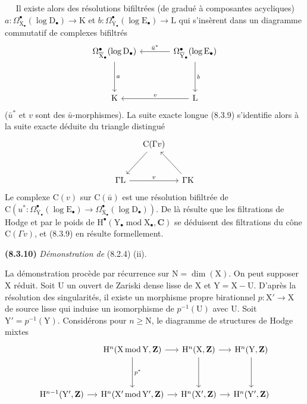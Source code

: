 \documentclass[11pt,leqno]{article}
\newcommand{\Page}[1]{\ifvmode\noindent\else\unskip\ \fi{\footnotesize\textcolor{gray}{[p.\,#1]}}\ \ignorespaces}
\begin{document}
\Page{44}
Il existe alors des résolutions bifiltrées (de gradué à composantes acycliques) \(a:\Omega_{\overline{\mathrm{X}}_\bullet}^\bullet(\log\mathrm{D}_\bullet)\to\mathrm{K}\) et \(b:\Omega_{\overline{\mathrm{Y}}_\bullet}^\bullet(\log\mathrm{E}_\bullet)\to\mathrm{L}\) qui s’insèrent dans un diagramme commutatif de complexes bifiltrés
\[
\begin{tikzcd}[column sep=large,row sep=huge]
\Omega_{\overline{\mathrm{X}}_\bullet}^\bullet(\log\mathrm{D}_\bullet)
  \arrow[d,"a"]
 & \Omega_{\overline{\mathrm{Y}}_\bullet}^\bullet(\log\mathrm{E}_\bullet)
   \arrow[l,"\bar{u}^*"'] \arrow[d,"b"]\\
\mathrm{K}
 & \mathrm{L} \arrow[l,"v"']
\end{tikzcd}
\]
(\(\bar{u}^*\) et \(v\) sont des \(\bar{u}\)-morphismes). La suite exacte longue (8.3.9) s’identifie alors à la suite exacte déduite du triangle distingué
\[
\begin{tikzcd}[column sep=small,row sep=large]
 & \mathrm{C}(\Gamma v) \arrow[dl] &\\
\Gamma\mathrm{L} \arrow[rr,"v"]
 & & \Gamma\mathrm{K} \arrow[ul]
\end{tikzcd}
\]
Le complexe \(\mathrm{C}(v)\) sur \(\mathrm{C}(\bar{u})\) est une résolution bifiltrée de \(\mathrm{C}(u^*:\Omega_{\overline{\mathrm{Y}}_\bullet}^\bullet(\log\mathrm{E}_\bullet)\to\Omega_{\overline{\mathrm{X}}_\bullet}^\bullet(\log\mathrm{D}_\bullet))\). De là résulte que les filtrations de Hodge et par le poids de \(\mathrm{H}^\bullet(\mathrm{Y}_\bullet\operatorname{mod}\mathrm{X}_\bullet,\mathbf{C})\) se déduisent des filtrations du cône \(\mathrm{C}(\Gamma v)\), et (8.3.9) en résulte formellement.

\textbf{(8.3.10)} \textit{Démonstration de} (8.2.4) (ii).

La démonstration procède par récurrence sur \(\mathrm{N}=\dim(\mathrm{X})\). On peut supposer \(\mathrm{X}\) réduit. Soit \(\mathrm{U}\) un ouvert de Zariski dense lisse de \(\mathrm{X}\) et \(\mathrm{Y}=\mathrm{X}-\mathrm{U}\). D’après la résolution des singularités, il existe un morphisme propre birationnel \(p:\mathrm{X}'\to\mathrm{X}\) de source lisse qui induise un isomorphisme de \(p^{-1}(\mathrm{U})\) avec \(\mathrm{U}\). Soit \(\mathrm{Y}'=p^{-1}(\mathrm{Y})\). Considérons pour \(n\geq\mathrm{N}\), le diagramme de structures de Hodge mixtes
\[
\begin{tikzcd}[column sep=small,row sep=huge]
 & \mathrm{H}^n(\mathrm{X}\operatorname{mod}\mathrm{Y},\mathbf{Z})
   \arrow[r] \arrow[d,"p^*"]
 & \mathrm{H}^n(\mathrm{X},\mathbf{Z}) \arrow[r] \arrow[d]
 & \mathrm{H}^n(\mathrm{Y},\mathbf{Z}) \arrow[d]\\
\mathrm{H}^{n-1}(\mathrm{Y}',\mathbf{Z}) \arrow[r]
 & \mathrm{H}^n(\mathrm{X}'\operatorname{mod}\mathrm{Y}',\mathbf{Z})
   \arrow[r]
 & \mathrm{H}^n(\mathrm{X}',\mathbf{Z}) \arrow[r]
 & \mathrm{H}^n(\mathrm{Y}',\mathbf{Z})
\end{tikzcd}
\]
\end{document}
